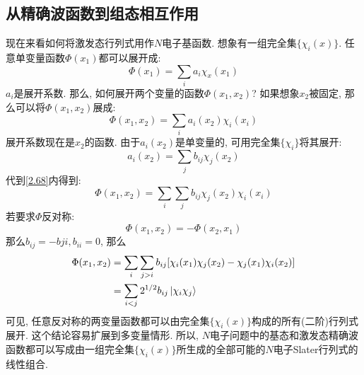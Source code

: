 \subsection{从精确波函数到组态相互作用}
 \label{sec2.2.7}
现在来看如何将激发态行列式用作$N$电子基函数. 想象有一组完全集$\{\chi_i(x)\}$. 任意单变量函数$\Phi(x_1)$都可以展开成:
\begin{equation}
	\Phi(x_1)=\sum_ia_i\chi_x(x_1)
\end{equation}
$a_i$是展开系数. 那么, 如何展开两个变量的函数$\Phi(x_1,x_2)$? 如果想象$x_2$被固定, 那么可以将$\Phi(x_1,x_2)$展成:
\begin{equation}
\label{2.68}
\Phi(x_1,x_2)=\sum_ia_i(x_2)\chi_i(x_i)
\end{equation}
展开系数现在是$x_2$的函数. 由于$a_i(x_2)$是单变量的, 可用完全集$\{\chi_i \}$将其展开:
\begin{equation}
a_i(x_2)=\sum_jb_{ij}\chi_j(x_2)
\end{equation}
代到\ref{2.68}内得到:
\begin{equation}
\Phi(x_1,x_2)=\sum_i\sum_jb_{ij}\chi_j(x_2)\chi_i(x_i)
\end{equation}
若要求$\Phi$反对称:
\begin{equation}
\Phi(x_1,x_2)=-\Phi(x_2,x_1)
\end{equation}
那么$b_{ij}=-b{ji},b_{ii}=0$, 那么
\begin{equation}
\begin{split}
\Phi(x_1,x_2)&=\sum_i\sum_{j>i}b_{ij}[\chi_i(x_1)\chi_j(x_2)-\chi_j(x_1)\chi_i(x_2)]\\
&=\sum_{i<j}2^{1/2}b_{ij}\Ket{\chi_i\chi_j}
\end{split}
\end{equation}
可见, 任意反对称的两变量函数都可以由完全集$\{\chi_i(x)\}$构成的所有(二阶)行列式展开. 这个结论容易扩展到多变量情形. 所以, $N$电子问题中的基态和激发态精确波函数都可以写成由一组完全集$\{\chi_i(x) \}$所生成的全部可能的$N$电子Slater行列式的线性组合.

